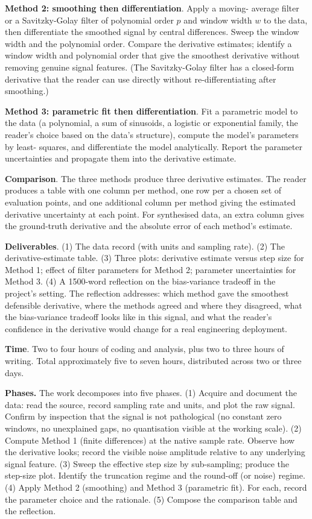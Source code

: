 \begin{project}
\textbf{Method 2: smoothing then differentiation}. Apply a moving-
average filter or a Savitzky-Golay filter of polynomial order $p$
and window width $w$ to the data, then differentiate the smoothed
signal by central differences. Sweep the window width and the
polynomial order. Compare the derivative estimates; identify a
window width and polynomial order that give the smoothest
derivative without removing genuine signal features. (The
Savitzky-Golay filter has a closed-form derivative that the
reader can use directly without re-differentiating after
smoothing.)

\textbf{Method 3: parametric fit then differentiation}. Fit a
parametric model to the data (a polynomial, a sum of sinusoids,
a logistic or exponential family, the reader's choice based on
the data's structure), compute the model's parameters by least-
squares, and differentiate the model analytically. Report the
parameter uncertainties and propagate them into the derivative
estimate.

\textbf{Comparison}. The three methods produce three derivative
estimates. The reader produces a table with one column per
method, one row per a chosen set of evaluation points, and one
additional column per method giving the estimated derivative
uncertainty at each point. For synthesised data, an extra column
gives the ground-truth derivative and the absolute error of each
method's estimate.

\textbf{Deliverables}. (1) The data record (with units and
sampling rate). (2) The derivative-estimate table. (3) Three
plots: derivative estimate versus step size for Method 1; effect
of filter parameters for Method 2; parameter uncertainties for
Method 3. (4) A 1500-word reflection on the bias-variance
tradeoff in the project's setting. The reflection addresses:
which method gave the smoothest defensible derivative, where the
methods agreed and where they disagreed, what the bias-variance
tradeoff looks like in this signal, and what the reader's
confidence in the derivative would change for a real engineering
deployment.

\textbf{Time}. Two to four hours of coding and analysis, plus two
to three hours of writing. Total approximately five to seven
hours, distributed across two or three days.

\textbf{Phases.} The work decomposes into five phases. (1)
Acquire and document the data: read the source, record sampling
rate and units, and plot the raw signal. Confirm by inspection
that the signal is not pathological (no constant zero windows, no
unexplained gaps, no quantisation visible at the working scale).
(2) Compute Method 1 (finite differences) at the native sample
rate. Observe how the derivative looks; record the visible noise
amplitude relative to any underlying signal feature. (3) Sweep
the effective step size by sub-sampling; produce the step-size
plot. Identify the truncation regime and the round-off (or
noise) regime. (4) Apply Method 2 (smoothing) and Method 3
(parametric fit). For each, record the parameter choice and the
rationale. (5) Compose the comparison table and the reflection.


\end{project}
